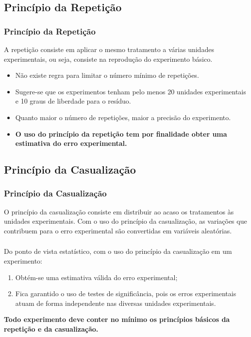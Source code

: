 \documentclass[14pt,aspectratio=1610]{beamer}
\begin{document}
\subsection{Princípio da Repetição}
\begin{frame}{}
\frametitle{Princípio da Repetição}
\begin{block}{}
\justifying
A repetição consiste em aplicar o mesmo tratamento a várias unidades
experimentais, ou seja, consiste na reprodução do experimento básico.\pause
\begin{itemize}
\item Não existe regra para limitar o número mínimo de repetições.\pause
\item Sugere-se que os experimentos tenham pelo menos 20 unidades experimentais e 10 graus de liberdade para o resíduo.\pause
\item Quanto maior o número de repetições, maior a precisão do experimento.\pause
\item {\bf O uso do princípio da repetição tem por finalidade obter uma estimativa do erro experimental.}
\end{itemize}
\end{block}
\end{frame}

\subsection{Princípio da Casualização}
\begin{frame}{}
\frametitle{Princípio da Casualização}
\begin{block}{}
\justifying
O princípio da casualização consiste em distribuir ao acaso os tratamentos às
unidades experimentais. Com o uso do princípio da casualização, as variações que contribuem para o erro experimental são convertidas em variáveis aleatórias.
\end{block}
\end{frame}

\begin{frame}{}
\frametitle{}
\begin{block}{}
\justifying
Do ponto de vista estatístico, com o uso do princípio da casualização em um
experimento:
\begin{enumerate}
\item Obtém-se uma estimativa válida do erro experimental;\pause
\item Fica garantido o uso de testes de significância, pois os erros experimentais
atuam de forma independente nas diversas unidades experimentais.\pause
\end{enumerate}
{\bf Todo experimento deve conter no mínimo os princípios básicos da repetição e da
casualização.}
\end{block}
\end{frame}
\end{document}
